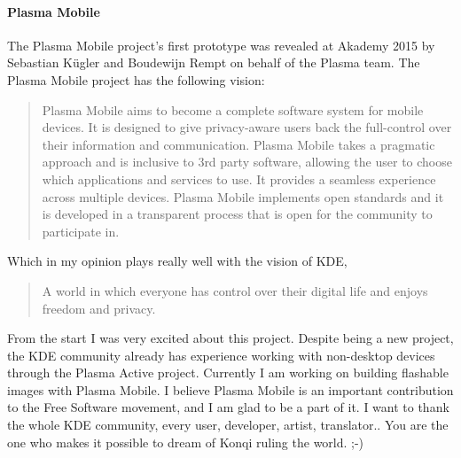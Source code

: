 \paragraph{Plasma Mobile} The Plasma Mobile project's first prototype was revealed at Akademy 2015 by Sebastian K\"{u}gler and Boudewijn Rempt on behalf of the Plasma team. The Plasma Mobile project has the following vision:

\begin{quote}
Plasma Mobile aims to become a complete software system for mobile devices. It is designed to give privacy-aware users back the full-control over their information and communication. Plasma Mobile takes a pragmatic approach and is inclusive to 3rd party software, allowing the user to choose which applications and services to use. It provides a seamless experience across multiple devices. Plasma Mobile implements open standards and it is developed in a transparent process that is open for the community to participate in.
\end{quote}

\noindent{}Which in my opinion plays really well with the vision of KDE,

\begin{quote}
A world in which everyone has control over their digital life and enjoys freedom and privacy.
\end{quote}

\noindent{}From the start I was very excited about this project. Despite being a new project, the KDE community already has experience working with non-desktop devices through the Plasma Active project. Currently I am working on building flashable images with Plasma Mobile. I believe Plasma Mobile is an important contribution to the Free Software movement, and I am glad to be a part of it.
\linebreak 
\linebreak
I want to thank the whole KDE community, every user, developer, artist, translator.. You are the one who makes it possible to dream of Konqi ruling the world. ;-)
